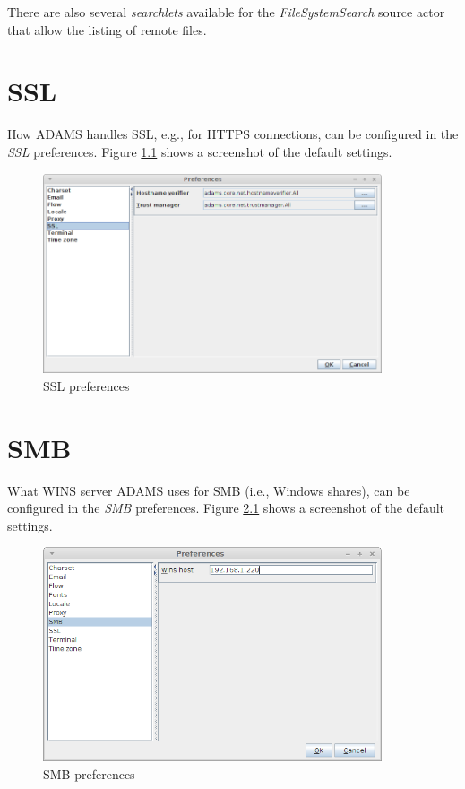 \documentclass[a4paper]{book}
\begin{document}
There are also several \textit{searchlets} available for the
\textit{FileSystemSearch} source actor that allow the listing of remote
files.


\chapter{SSL}
How ADAMS handles SSL, e.g., for HTTPS connections, can be configured in the
\textit{SSL} preferences. Figure \ref{ssl_setup} shows a screenshot of the
default settings.

\begin{figure}[htb]
  \centering
  \includegraphics[width=10.0cm]{images/ssl_setup.png}
  \caption{SSL preferences}
  \label{ssl_setup}
\end{figure}


\chapter{SMB}
What WINS server ADAMS uses for SMB (i.e., Windows shares), can be configured in the
\textit{SMB} preferences. Figure \ref{smb_setup} shows a screenshot of the
default settings.

\begin{figure}[htb]
  \centering
  \includegraphics[width=10.0cm]{images/smb_setup.png}
  \caption{SMB preferences}
  \label{smb_setup}
\end{figure}
\end{document}
